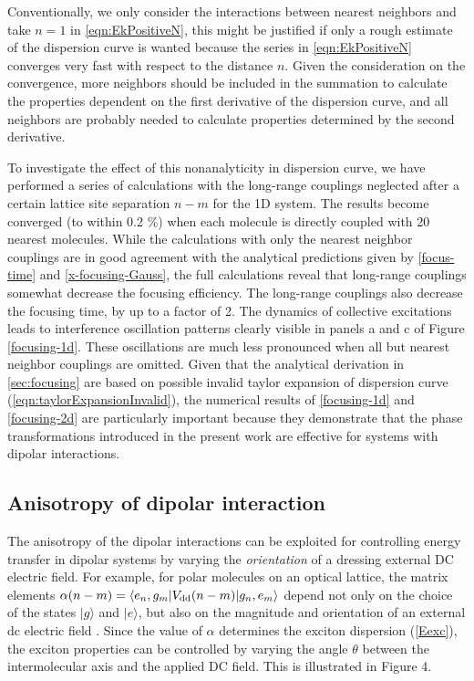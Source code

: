 Conventionally, we only consider the interactions between nearest neighbors and take $n=1$ in
 \autoref{eqn:EkPositiveN}, this might be justified if only a rough estimate of the dispersion curve is wanted
because the series in \autoref{eqn:EkPositiveN} converges very fast with respect to the distance $n$. Given the 
consideration on the convergence, more neighbors should be included in the summation to calculate the properties 
dependent on the first derivative of the dispersion curve, and all neighbors are probably needed to calculate 
properties determined by the second derivative. 


To investigate the effect of this nonanalyticity in dispersion curve, we have performed a series of calculations with the long-range couplings neglected 
after a certain lattice site separation $n-m$ for the 1D system. The results become  converged (to within 0.2 \%) when
 each molecule is directly coupled with 20 nearest molecules. While the calculations with only the nearest neighbor
 couplings are in good agreement  with the analytical predictions given by \autoref{focus-time} and \autoref{x-focusing-Gauss}, the full calculations reveal that long-range 
couplings somewhat decrease the focusing efficiency. The long-range couplings also decrease the focusing time, 
by up to a factor of 2. The dynamics of collective excitations leads to interference oscillation patterns clearly 
visible in panels a and c of Figure \ref{focusing-1d}. These oscillations are much less pronounced when all but nearest
 neighbor couplings are omitted. Given that the analytical derivation in \autoref{sec:focusing} are based on possible 
invalid taylor expansion of dispersion curve (\autoref{eqn:taylorExpansionInvalid}), the numerical results of 
\autoref{focusing-1d} and \autoref{focusing-2d} are particularly important
 because they demonstrate that the phase transformations introduced in the present work are effective  for 
systems with dipolar interactions. 

\subsection{Anisotropy of dipolar interaction}
\label{sec:anisotropy}

The anisotropy of the dipolar interactions can be exploited for controlling energy transfer in dipolar systems by varying the {\it orientation} of a dressing external DC electric field. 
For example,  for polar molecules on an optical lattice,  
the matrix elements  $\alpha(n-m) = \langle e_{n} , g_{m} | {V}_{\rm dd}(n-m) | g_{n}, e_{m} \rangle$ depend not only on the choice of
 the states $|g\rangle$ and $|e\rangle$, but also on the magnitude and orientation of an external dc electric field
\cite{biexcitons, felipe}. Since the value of $\alpha$ determines the exciton dispersion (\ref{Eexc}),
 the exciton properties can be controlled by varying the angle $\theta$ between the intermolecular axis
and the applied DC field. This is illustrated in Figure 4. 

